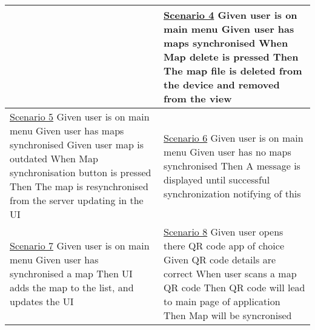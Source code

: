 \begin{longtable}{| p{} | p{}|}
	&
	
	\newline\underline{Scenario 4}\newline
	Given user is on main menu \newline
	Given user has maps synchronised \newline
	When Map delete is pressed \newline 
	Then The map file is deleted from the device and removed from the view\newline\\\hline
	
	\newline\underline{Scenario 5}\newline
	Given user is on main menu \newline
	Given user has maps synchronised \newline
	Given user map is outdated \newline
	When Map synchronisation button is pressed \newline 
	Then The map is resynchronised from the server updating in the UI\newline
	
	&
	
	\newline\underline{Scenario 6}\newline
	Given user is on main menu \newline
	Given user has no maps synchronised \newline
	Then A message is displayed until successful synchronization notifying of this\newline\\\hline
	
	\newline\underline{Scenario 7}\newline
	Given user is on main menu \newline
	Given user has synchronised a map\newline
	Then UI adds the map to the list, and updates the UI\newline
	
	&
	
	\newline\underline{Scenario 8}\newline
	Given user opens there QR code app of choice \newline
	Given QR code details are correct\newline
	When user scans a map QR code\newline
	Then QR code will lead to main page of application\newline
	Then Map will be syncronised\newline
	\\\hline
	

\end{longtable}
